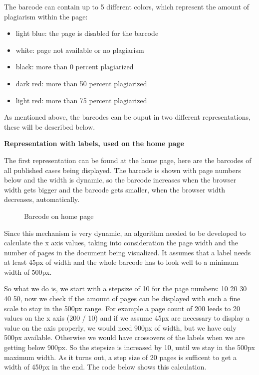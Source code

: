 The barcode can contain up to 5 different colors, which represent the amount of plagiarism within the page:

\begin{itemize}
\item      light blue: the page is disabled for the barcode
\item      white: page not available or no plagiarism
\item      black: more than 0 percent plagiarized
\item      dark red: more than 50 percent plagiarized
\item      light red: more than 75 percent plagiarized
\end{itemize}

As mentioned above, the barcodes can be ouput in two different representations, these will be described below.

\textbf{Representation with labels, used on the home page}

The first representation can be found at the home page, here are the barcodes of all published cases being displayed. The barcode is shown with page numbers below and the width is dynamic, so the barcode increases when the browser width gets bigger and the barcode gets smaller, when the browser width decreases, automatically.

\begin{figure}[!h]
  \centering
  \caption{Barcode on home page}
  \label{fig:feature-barcode-website}
\end{figure}

Since this mechanism is very dynamic, an algorithm needed to be developed to calculate the x axis values, taking into consideration the page width and the number of pages in the document being visualized. It assumes that a label needs at least 45px of width and the whole barcode has to look well to a minimum width of 500px.

So what we do is, we start with a stepsize of 10 for the page numbers: 10 20 30 40 50, now we check if the amount of pages can be displayed with such a fine scale to stay in the 500px range. For example a page count of 200 leeds to 20 values on the x axis (200 / 10) and if we assume 45px are necessary to display a value on the axis properly, we would need 900px of width, but we have only 500px available. Otherwise we would have crossovers of the labels when we are getting below 900px. So the stepsize is increased by 10, until we stay in the 500px maximum width. As it turns out, a step size of 20 pages is sufficent to get a width of 450px in the end. The code below shows this calculation.

